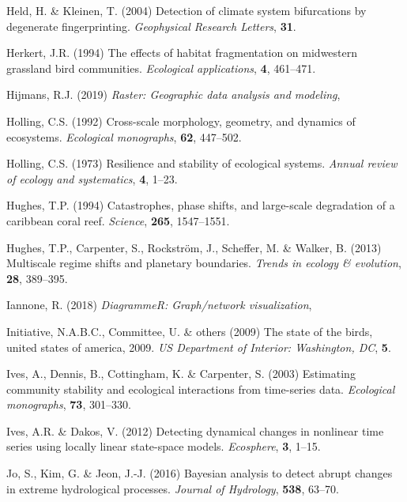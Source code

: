 \documentclass[12pt,twoside,openany]{reedthesis}
\begin{document}
\leavevmode\hypertarget{ref-held2004detection}{}%
Held, H. \& Kleinen, T. (2004) Detection of climate system bifurcations by degenerate fingerprinting. \emph{Geophysical Research Letters}, \textbf{31}.

\leavevmode\hypertarget{ref-herkert1994effects}{}%
Herkert, J.R. (1994) The effects of habitat fragmentation on midwestern grassland bird communities. \emph{Ecological applications}, \textbf{4}, 461--471.

\leavevmode\hypertarget{ref-raster}{}%
Hijmans, R.J. (2019) \emph{Raster: Geographic data analysis and modeling},

\leavevmode\hypertarget{ref-holling1992cross}{}%
Holling, C.S. (1992) Cross-scale morphology, geometry, and dynamics of ecosystems. \emph{Ecological monographs}, \textbf{62}, 447--502.

\leavevmode\hypertarget{ref-holling1973resilience}{}%
Holling, C.S. (1973) Resilience and stability of ecological systems. \emph{Annual review of ecology and systematics}, \textbf{4}, 1--23.

\leavevmode\hypertarget{ref-hughes_catastrophes_1994}{}%
Hughes, T.P. (1994) Catastrophes, phase shifts, and large-scale degradation of a caribbean coral reef. \emph{Science}, \textbf{265}, 1547--1551.

\leavevmode\hypertarget{ref-hughes2013multiscale}{}%
Hughes, T.P., Carpenter, S., Rockström, J., Scheffer, M. \& Walker, B. (2013) Multiscale regime shifts and planetary boundaries. \emph{Trends in ecology \& evolution}, \textbf{28}, 389--395.

\leavevmode\hypertarget{ref-DiagrammeR}{}%
Iannone, R. (2018) \emph{DiagrammeR: Graph/network visualization},

\leavevmode\hypertarget{ref-north2009state}{}%
Initiative, N.A.B.C., Committee, U. \& others (2009) The state of the birds, united states of america, 2009. \emph{US Department of Interior: Washington, DC}, \textbf{5}.

\leavevmode\hypertarget{ref-ives2003estimating}{}%
Ives, A., Dennis, B., Cottingham, K. \& Carpenter, S. (2003) Estimating community stability and ecological interactions from time-series data. \emph{Ecological monographs}, \textbf{73}, 301--330.

\leavevmode\hypertarget{ref-ives2012detecting}{}%
Ives, A.R. \& Dakos, V. (2012) Detecting dynamical changes in nonlinear time series using locally linear state-space models. \emph{Ecosphere}, \textbf{3}, 1--15.

\leavevmode\hypertarget{ref-jo2016bayesian}{}%
Jo, S., Kim, G. \& Jeon, J.-J. (2016) Bayesian analysis to detect abrupt changes in extreme hydrological processes. \emph{Journal of Hydrology}, \textbf{538}, 63--70.
\end{document}
